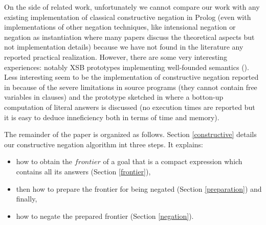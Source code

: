 \documentclass{tlp}
\begin{document}
On the side of related work, unfortunately we cannot compare our work
with any existing implementation of classical constructive negation in
Prolog (even with implementations of other negation techniques, like
intensional negation \cite{Barbuti1,Bruscoli,SusanaFLOPS04} or negation
as instantiation \cite{DiPierro} where many papers discuss the
theoretical aspects but not implementation details) because we have
not found in the literature any reported practical
realization. However, there are some very interesting experiences:
notably XSB prototypes implementing well-founded semantics
(\cite{Alferes95}). Less interesting seem to be the implementation of
constructive negation reported in \cite{Bartak} because of the severe
limitations in source programs (they cannot contain free variables in
clauses) and the prototype sketched in \cite{BNC-cneg} where a
botton-up computation of literal answers is discussed (no execution
times are reported but it is easy to deduce inneficiency both in terms
of time and memory).



The remainder of the paper is organized as follows. Section \ref{constructive}
details our constructive negation algorithm int three steps. It explains:
\begin{itemize} 
      \item how to obtain the $frontier$ of a goal that is a compact
expression which contains all its answers (Section \ref{frontier}),
      \item then how to prepare the frontier for being negated (Section
\ref{preparation}) and finally,
      \item how to negate the prepared frontier (Section \ref{negation}).
\end{itemize} 
\end{document}
